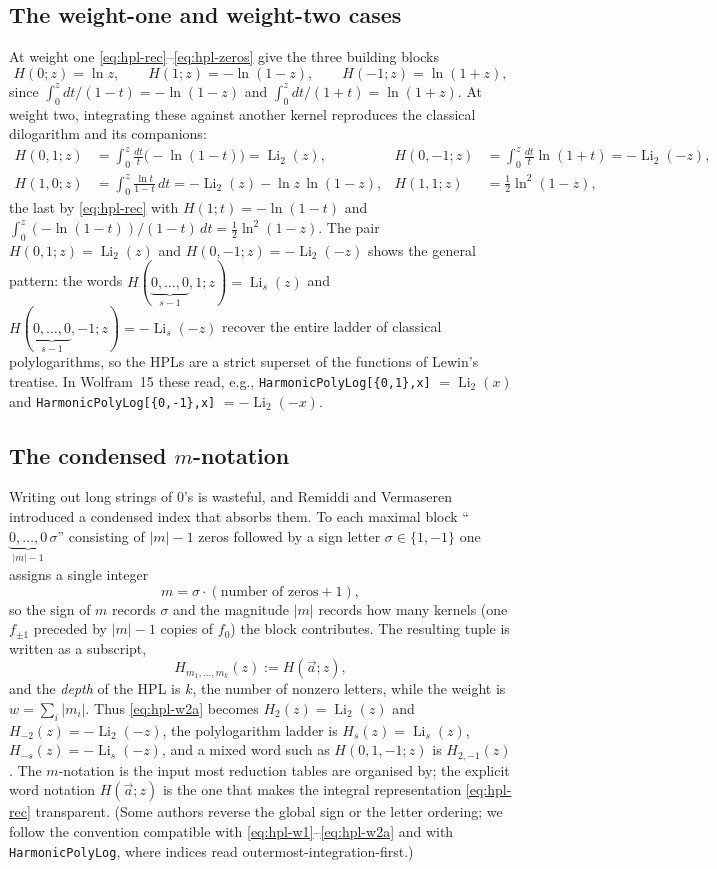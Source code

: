 \documentclass[11pt]{article}
\DeclareMathOperator{\Li}{Li}
\theoremstyle{plain}
\theoremstyle{remark}
\begin{document}
\subsection{The weight-one and weight-two cases}

At weight one \eqref{eq:hpl-rec}--\eqref{eq:hpl-zeros} give the three building blocks
\begin{equation}\label{eq:hpl-w1}
  H(0;z)=\ln z,\qquad H(1;z)=-\ln(1-z),\qquad H(-1;z)=\ln(1+z),
\end{equation}
since $\int_0^z dt/(1-t)=-\ln(1-z)$ and $\int_0^z dt/(1+t)=\ln(1+z)$. At weight two, integrating these against another kernel reproduces the classical dilogarithm and its companions:
\begin{align}
  H(0,1;z)&=\int_0^z\frac{dt}{t}\bigl(-\ln(1-t)\bigr)=\Li_2(z), &
  H(0,-1;z)&=\int_0^z\frac{dt}{t}\ln(1+t)=-\Li_2(-z),\label{eq:hpl-w2a}\\
  H(1,0;z)&=\int_0^z\frac{\ln t}{1-t}\,dt=-\Li_2(z)-\ln z\,\ln(1-z), &
  H(1,1;z)&=\tfrac12\ln^2(1-z),\label{eq:hpl-w2b}
\end{align}
the last by \eqref{eq:hpl-rec} with $H(1;t)=-\ln(1-t)$ and $\int_0^z(-\ln(1-t))/(1-t)\,dt=\tfrac12\ln^2(1-z)$. The pair $H(0,1;z)=\Li_2(z)$ and $H(0,-1;z)=-\Li_2(-z)$ shows the general pattern: the words $H(\underbrace{0,\dots,0}_{s-1},1;z)=\Li_s(z)$ and $H(\underbrace{0,\dots,0}_{s-1},-1;z)=-\Li_s(-z)$ recover the entire ladder of classical polylogarithms, so the HPLs are a strict superset of the functions of Lewin's treatise. In Wolfram~15 these read, e.g., \texttt{HarmonicPolyLog[\{0,1\},x]} $=\Li_2(x)$ and \texttt{HarmonicPolyLog[\{0,-1\},x]} $=-\Li_2(-x)$.

\subsection{The condensed $m$-notation}

Writing out long strings of $0$'s is wasteful, and Remiddi and Vermaseren introduced a condensed index that absorbs them. To each maximal block ``$\underbrace{0,\dots,0}_{|m|-1}\,\sigma$'' consisting of $|m|-1$ zeros followed by a sign letter $\sigma\in\{1,-1\}$ one assigns a single integer
\[
  m=\sigma\cdot(\text{number of zeros}+1),
\]
so the sign of $m$ records $\sigma$ and the magnitude $|m|$ records how many kernels (one $f_{\pm1}$ preceded by $|m|-1$ copies of $f_0$) the block contributes. The resulting tuple is written as a subscript,
\[
  H_{m_1,\dots,m_k}(z):=H(\vec a;z),
\]
and the \emph{depth} of the HPL is $k$, the number of nonzero letters, while the weight is $w=\sum_i|m_i|$. Thus \eqref{eq:hpl-w2a} becomes $H_{2}(z)=\Li_2(z)$ and $H_{-2}(z)=-\Li_2(-z)$, the polylogarithm ladder is $H_{s}(z)=\Li_s(z)$, $H_{-s}(z)=-\Li_s(-z)$, and a mixed word such as $H(0,1,-1;z)$ is $H_{2,-1}(z)$. The $m$-notation is the input most reduction tables are organised by; the explicit word notation $H(\vec a;z)$ is the one that makes the integral representation \eqref{eq:hpl-rec} transparent. (Some authors reverse the global sign or the letter ordering; we follow the convention compatible with \eqref{eq:hpl-w1}--\eqref{eq:hpl-w2a} and with \texttt{HarmonicPolyLog}, where indices read outermost-integration-first.)
\end{document}
